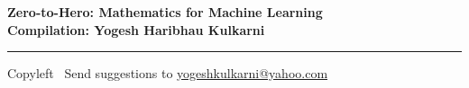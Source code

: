 
\graphicspath{{images/}}



\footnotesize


\begin{center}
\Large{\textbf{Zero-to-Hero: Mathematics for Machine Learning\\ Compilation: Yogesh Haribhau Kulkarni}}  
\end{center}

\begin{multicols}{2}

\end{multicols}

\rule{\linewidth}{0.25pt}
\scriptsize
Copyleft \textcopyleft\  Send suggestions to 
\href{http://www.yogeshkulkarni.com}{yogeshkulkarni@yahoo.com}


